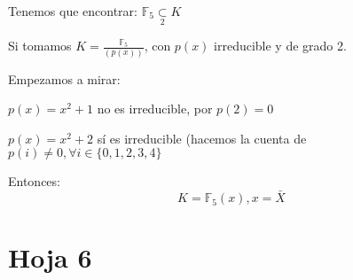 \begin{problem}[2]
Tenemos que encontrar: $\mathbb{F}_5 \underset{2}{\subset} K$
\solution

Si tomamos $K = \frac{\mathbb{F}_5}{(p(x))}$, con $p(x)$ irreducible y de grado 2.

Empezamos a mirar:

$p(x) = x^2 + 1$ no es irreducible, por $p(2) = 0$

$p(x) = x^2 + 2$ sí es irreducible (hacemos la cuenta de $p(i) ≠ 0, ∀i ∈ \{0,1,2,3,4\}$


Entonces: $$K = \mathbb{F}_5(x), x = \bar{X}$$

\end{problem}

\section{Hoja 6}

